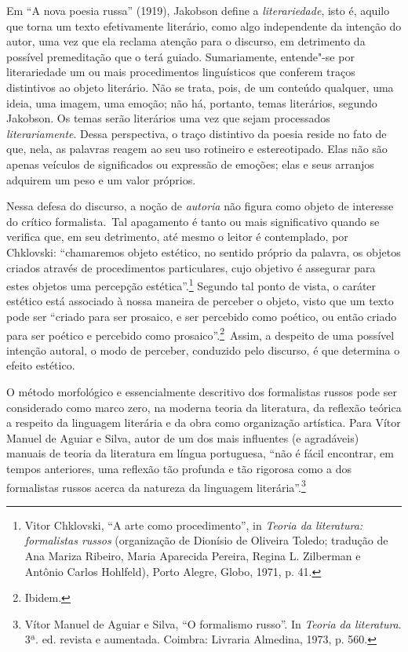 Em ``A nova poesia russa'' (1919), Jakobson define
a \emph{literariedade}, isto é, aquilo que torna um texto efetivamente
literário, como algo independente da intenção do autor, uma vez que ela
reclama atenção para o discurso, em detrimento da possível premeditação
que o terá guiado. Sumariamente, entende"-se por literariedade um ou mais
procedimentos linguísticos que conferem traços distintivos ao objeto
literário. Não se trata, pois, de um conteúdo qualquer, uma ideia, uma
imagem, uma emoção; não há, portanto, temas literários, segundo
Jakobson. Os temas serão literários uma vez que sejam
processados \emph{literariamente}. Dessa perspectiva, o traço distintivo
da poesia reside no fato de que, nela, as palavras reagem ao seu uso
rotineiro e estereotipado. Elas não são apenas veículos de significados
ou expressão de emoções; elas e seus arranjos adquirem um peso e um
valor próprios.

Nessa defesa do discurso, a noção de \emph{autoria} não figura como
objeto de interesse do crítico formalista.~Tal apagamento é tanto ou
mais significativo quando se verifica que, em seu detrimento, até mesmo
o leitor é contemplado, por Chklovski: ``chamaremos objeto estético, no
sentido próprio da palavra, os objetos criados através de procedimentos
particulares, cujo objetivo é assegurar para estes objetos uma percepção
estética''.\footnote{Vitor Chklovski, ``A arte como procedimento'', in
  \emph{Teoria da literatura: formalistas russos} (organização de
  Dionísio de Oliveira Toledo; tradução de Ana Mariza Ribeiro, Maria
  Aparecida Pereira, Regina L. Zilberman e Antônio Carlos Hohlfeld),
  Porto Alegre, Globo, 1971, p. 41.} Segundo tal ponto de vista, o
caráter estético está associado à nossa maneira de perceber o objeto,
visto que um texto pode ser ``criado para ser prosaico, e ser percebido
como poético, ou então criado para ser poético e percebido como
prosaico''.\footnote{Ibidem.}~Assim, a despeito de uma possível intenção
autoral, o modo de perceber, conduzido pelo discurso, é que determina o
efeito estético.

O método morfológico e essencialmente descritivo dos formalistas russos
pode ser considerado como marco zero, na moderna teoria da literatura,
da reflexão teórica a respeito da linguagem literária e da obra como
organização artística. Para Vítor Manuel de Aguiar e Silva, autor de um
dos mais influentes (e agradáveis) manuais de teoria da literatura em
língua portuguesa, ``não é fácil encontrar, em tempos anteriores, uma
reflexão tão profunda e tão rigorosa como a dos formalistas russos
acerca da natureza da linguagem literária''.\footnote{Vítor Manuel de
  Aguiar e Silva, ``O formalismo russo''. In \emph{Teoria da
  literatura}. 3ª. ed. revista e aumentada. Coimbra: Livraria Almedina,
  1973, p. 560.}

